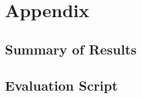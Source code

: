 \appendix\chapter{Appendix}\label{C:appendix}

\section{Summary of Results}\label{A:summary}

\section{Evaluation Script}\label{A:eval}
